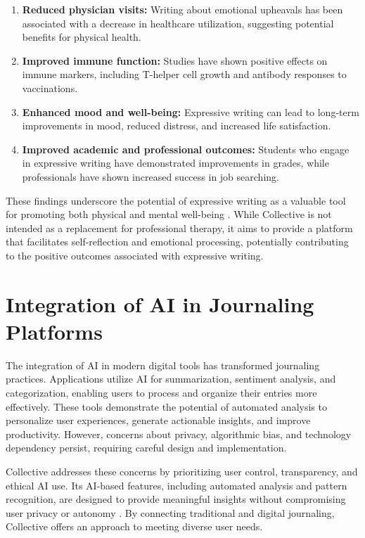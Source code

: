 \begin{enumerate}
	\item \textbf{Reduced physician visits:} Writing about emotional upheavals has been associated with a decrease in healthcare utilization, suggesting potential benefits for physical health.
	
	\item \textbf{Improved immune function:} Studies have shown positive effects on immune markers, including T-helper cell growth and antibody responses to vaccinations.
	
	\item \textbf{Enhanced mood and well-being:} Expressive writing can lead to long-term improvements in mood, reduced distress, and increased life satisfaction.
	
	\item \textbf{Improved academic and professional outcomes:} Students who engage in expressive writing have demonstrated improvements in grades, while professionals have shown increased success in job searching.
\end{enumerate}

These findings underscore the potential of expressive writing as a valuable tool for promoting both physical and mental well-being \cite{pennebaker1999forming}. While Collective is not intended as a replacement for professional therapy, it aims to provide a platform that facilitates self-reflection and emotional processing, potentially contributing to the positive outcomes associated with expressive writing.

\section{Integration of AI in Journaling Platforms}\label{sec:ai-integration}

The integration of AI in modern digital tools has transformed journaling practices. Applications utilize AI for summarization, sentiment analysis, and categorization, enabling users to process and organize their entries more effectively. These tools demonstrate the potential of automated analysis to personalize user experiences, generate actionable insights, and improve productivity. However, concerns about privacy, algorithmic bias, and technology dependency persist, requiring careful design and implementation.

Collective addresses these concerns by prioritizing user control, transparency, and ethical AI use. Its AI-based features, including automated analysis and pattern recognition, are designed to provide meaningful insights without compromising user privacy or autonomy \cite{allahyari2017text}. By connecting traditional and digital journaling, Collective offers an approach to meeting diverse user needs.

